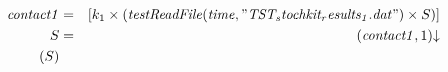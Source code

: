 
\begin{eqnarray*}
\mathit{contact1} & = & [k_1\times (\mathit{testReadFile}(\mathit{time},"\mathit{TST_stochkit_results_1}.\mathit{dat}")\times S)]\\
%

%
S & = & (\mathit{contact1},1){\downarrow}\\
%

%
(S)\end{eqnarray*}
